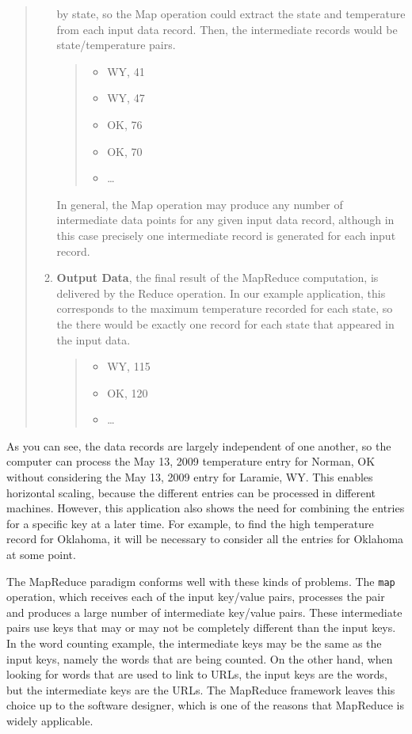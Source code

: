 \begin{quote}
\begin{enumerate}
        by state, so the Map operation could extract
        the state and temperature from each input data record.
        Then, the intermediate records would be state/temperature pairs.
        \begin {quote}
        \begin{itemize}
            \item WY, 41
            \item WY, 47
            \item OK, 76
            \item OK, 70
            \item \dots
        \end{itemize}
        \end{quote}
        In general, the Map operation may produce any number of intermediate
        data points for any given input data record, although in this case
        precisely one intermediate record is generated for each input record.
    \item \textbf{Output Data}, the final result of the MapReduce computation,
        is delivered by the Reduce operation. In our example application, this
        corresponds to the maximum temperature recorded for each state, so the
        there would be exactly one record for each state that appeared in the input data.
        \begin {quote}
        \begin{itemize}
            \item WY, 115
            \item OK, 120
            \item \dots
        \end{itemize}
        \end{quote}
\end{enumerate}
\end{quote}
As you can see, the data records are largely independent of one another, so the computer
can process the May 13, 2009 temperature entry for Norman, OK without considering the
May 13, 2009 entry for Laramie, WY.  This enables horizontal scaling, because the
different entries can be processed in different machines.
However, this application also shows the need for combining
the entries for a specific key at a later time.  For example,
to find the high temperature record for Oklahoma, it will be
necessary to consider all the entries for Oklahoma at some
point.

The MapReduce paradigm conforms well with these kinds of problems.
The \texttt{map} operation, which receives each
of the input key/value pairs, processes the
pair and produces a large number of intermediate
key/value pairs.  These intermediate pairs use keys that may
or may not be completely different than the input keys.
In the word counting example, the intermediate keys may be the same
as the input keys, namely the words that are being counted.
On the other hand, when looking for words that are used to
link to URLs, the input keys are the words, but the
intermediate keys are the URLs. The MapReduce framework leaves
this choice up to the software designer, which is
one of the reasons that MapReduce is widely applicable.

